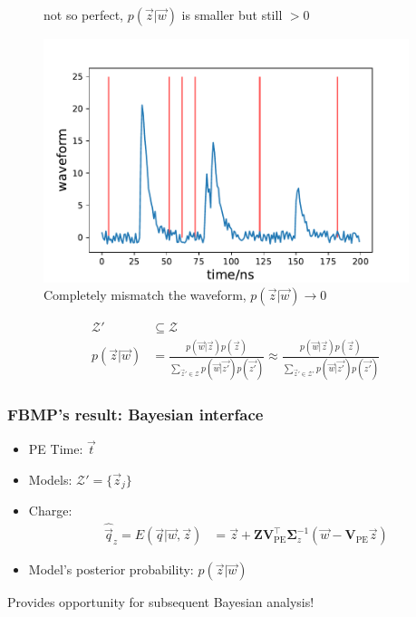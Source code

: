 \documentclass{beamer}
\begin{document}
\begin{CJK*}{UTF8}{gbsn}
\begin{frame}
\begin{minipage}[c]{0.33\textwidth}
\begin{figure}[H]
        \caption{not so perfect, $p(\vec{z}|\vec{w})$ is smaller but still $>0$}
        \label{fig:not so perfect PE}
    \end{figure}
\end{minipage}\begin{minipage}[c]{0.33\textwidth}
    \begin{figure}[H]
        \centering
            \includegraphics[width=0.95\textwidth]{img/nonsense_PE.pdf}
        \caption{Completely mismatch the waveform, $p(\vec{z}|\vec{w}) \rightarrow 0$}
        \label{fig:nonsense PE}
    \end{figure}
\end{minipage}
\begin{align*}
    \mathcal{Z}' &\subseteq \mathcal{Z} \\
    p(\vec{z}|\vec{w}) &= \frac{p(\vec{w}|\vec{z})p(\vec{z})}{\sum_{\vec{z}'\in\mathcal{Z}}p(\vec{w}|\vec{z'})p(\vec{z'})} \approx \frac{p(\vec{w}|\vec{z})p(\vec{z})}{\sum_{\vec{z}'\in\mathcal{Z}'}p(\vec{w}|\vec{z'})p(\vec{z'})}
\end{align*}
\end{frame}

\begin{frame}
\frametitle{FBMP's result: Bayesian interface}
\begin{itemize}
    \item PE Time: $\vec{t}$
    \item Models: $\mathcal{Z}'=\{\vec{z}_j\}$
    \item Charge: \begin{align*}
        \hat{\vec{q}}_z = E(\vec{q}|\vec{w},\vec{z}) &= \vec{z} + \bm{Z}\bm{V}_\mathrm{PE}^\intercal\bm{\Sigma}_z^{-1}(\vec{w}-\bm{V}_\mathrm{PE}\vec{z})
        \end{align*}
    \item Model's posterior probability: $p(\vec{z}|\vec{w})$
\end{itemize}
\begin{center}
    Provides opportunity for subsequent Bayesian analysis! 
\end{center}
\end{frame}


\end{CJK*}
\end{document}
